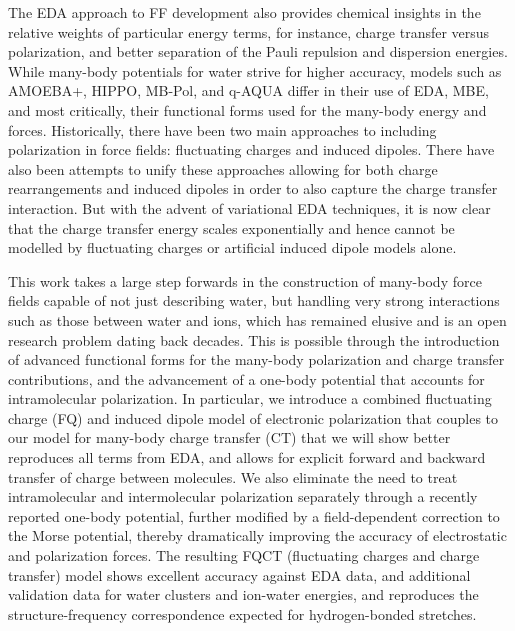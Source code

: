 \documentclass[journal=jctcce,manuscript=article]{achemso}
\begin{document}
The EDA approach to FF development also provides chemical insights in the relative weights of particular energy terms, for instance, charge transfer versus polarization, and better separation of the Pauli repulsion and dispersion energies. While many-body potentials for water strive for higher accuracy, models such as AMOEBA+, HIPPO\cite{rackers2021polarizable}, MB-Pol, and q-AQUA differ in their use of EDA, MBE, and most critically, their functional forms used for the many-body energy and forces. Historically, there have been two main approaches to including polarization in force fields: fluctuating charges\cite{rick1994dynamical} and induced dipoles\cite{applequist1985multipole}. There have also been attempts to unify these approaches allowing for both charge rearrangements and induced dipoles\cite{stern2001combined} in order to also capture the charge transfer interaction.\cite{rick1994dynamical} But with the advent of variational EDA  techniques\cite{khaliullin2007,horn2016probing,Mao:2021:EDA-review}, it is now clear that the charge transfer energy scales exponentially and hence cannot be modelled by fluctuating charges or artificial induced dipole models alone.

This work takes a large step forwards in the construction of many-body force fields capable of not just describing water, but handling very strong interactions such as those between water and ions, which has remained elusive and is an open research problem dating back decades. This is possible through the introduction of advanced functional forms for the many-body polarization and charge transfer contributions, and the advancement of a one-body potential that accounts for intramolecular polarization. In particular, we introduce a combined fluctuating charge (FQ) and induced dipole model of electronic polarization that couples to our model for many-body charge transfer (CT) that we will show better reproduces all terms from EDA, and allows for explicit forward and backward transfer of charge between molecules. We also eliminate the need to treat intramolecular and intermolecular polarization separately through a recently reported one-body potential\cite{Sami2024}, further modified by a field-dependent correction to the Morse potential, thereby dramatically improving the accuracy of electrostatic and polarization forces. The resulting FQCT (fluctuating charges and charge transfer) model shows excellent accuracy against EDA data, and additional validation data for water clusters and ion-water energies, and reproduces the structure-frequency correspondence expected for hydrogen-bonded  stretches.\cite{boyer2019beyond}
\end{document}
